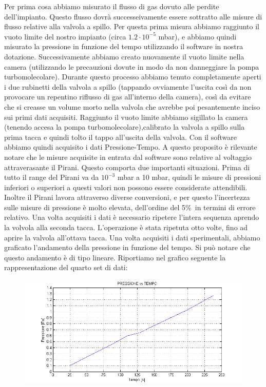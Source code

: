 \documentclass[a4paper,11pt]{article}
\begin{document}
Per prima cosa abbiamo misurato il flusso di gas dovuto alle perdite dell'impianto. Questo flusso dovrà successeivamente essere sottratto alle misure di flusso relative alla valvola a spillo. Per questa prima misura abbiamo raggiunto il vuoto limite del nostro impianto (circa $1.2\cdot10^{-5}$ mbar), e abbiamo quindi misurato la pressione in funzione del tempo utilizzando il software in nostra dotazione.
Successivamente abbiamo creato nuovamente il vuoto limite nella camera (utilizzando le precauzioni dovute in modo da non danneggiare la pompa turbomolecolare). Durante questo processo abbiamo tenuto completamente aperti i due rubinetti della valvola a spillo (tappando ovviamente l'uscita così da non provocare un repentino riflusso di gas all'interno della camera), così da evitare che si creasse un volume morto nella valvola che avrebbe poi pesantemente inciso sui primi dati acquisiti. Raggiunto il vuoto limite abbiamo sigillato la camera (tenendo accesa la pompa turbomolecolare),calibrato la valvola a spillo sulla prima tacca e quindi tolto il tappo all'uscita della valvola. Con il software abbiamo quindi acquisito i dati Pressione-Tempo. 
A questo proposito è rilevante notare che le misure acquisite in entrata dal software sono relative al voltaggio attraverasante il Pirani. Questo comporta due importanti situazioni. Prima di tutto il range del Pirani va da $10^{-3}$ mbar a 10 mbar, quindi le misure di pressioni inferiori o superiori a questi valori non possono essere considerate attendibili. Inoltre il Pirani lavora attraverso diverse conversioni, e per questo l'incertezza sulle misure di pressione è molto elevata, dell'ordine del 5\%\ in termini di errore relativo. 
Una volta acquisiti i dati è necessario ripetere l'intera sequenza aprendo  la volvola alla seconda tacca. L'operazione è stata ripetuta otto volte, fino ad aprire la valvola all'ottava tacca.  
Una volta acquisiti i dati sperimentali, abbiamo graficato l'andamento della pressione in funzione del tempo. Si può notare che questo andamento è di tipo lineare. Riportiamo nel grafico seguente la rappresentazione del quarto set di dati:
 \begin{center} 
\begin{figure}[htpd]
\hspace{-50 pt}
\includegraphics{graficoP4.png}


\end{figure}
\end{center}
\end{document}
